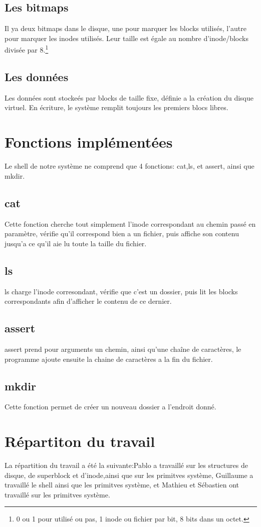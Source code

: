 \documentclass{report}
\begin{document}
\subsection*{Les bitmaps}
Il ya deux bitmaps dans le disque, une pour marquer les blocks utilisés, l'autre pour marquer les inodes utilisés. Leur taille est égale au nombre d'inode/blocks divisée par 8.\footnote{0 ou 1 pour utilisé ou pas, 1 inode ou fichier par bit, 8 bits dans un octet.}
\subsection*{Les données}
Les données sont stockeés par blocks de taille fixe, définie a la création du disque virtuel. En écriture, le système remplit toujours les premiers blocs libres.

\section*{Fonctions implémentées}
Le shell de notre système ne comprend que 4 fonctions: cat,ls, et assert, ainsi que mkdir.
\subsection*{cat}
Cette fonction cherche tout simplement l'inode correspondant au chemin passé en paramètre, vérifie qu'il correspond bien a un fichier, puis affiche son contenu jusqu'a ce qu'il aie lu toute la taille du fichier.
\subsection*{ls}
ls charge l'inode corresondant, vérifie que c'est un dossier, puis lit les blocks correspondants afin d'afficher le contenu de ce dernier.
\subsection*{assert}
assert prend pour arguments un chemin, ainsi qu'une chaîne de caractères, le programme ajoute ensuite la chaine de caractères a la fin du fichier.
\subsection*{mkdir}
Cette fonction permet de créer un nouveau dossier a l'endroit donné.

\section*{Répartiton du travail}
La répartition du travail a été la suivante:Pablo a travaillé sur les structures de disque, de superblock et d'inode,ainsi que sur les primitves système, Guillaume a travaillé le shell ainsi que les primitves système, et Mathieu et Sébastien ont travaillé sur les primitves système.
\end{document}

